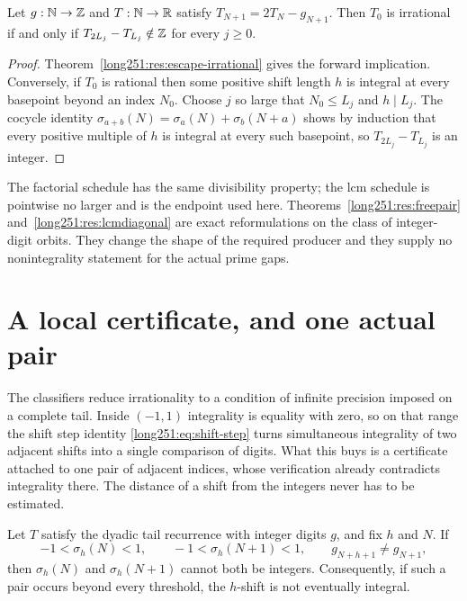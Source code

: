 \documentclass[11pt]{article}
\begin{document}
\begin{theorem}\label{long251:res:lcmdiagonal}
Let $g:\mathbb{N}\to\mathbb{Z}$ and $T:\mathbb{N}\to\mathbb{R}$ satisfy $T_{N+1}=2T_N-g_{N+1}$.  Then
$T_0$ is irrational if and only if
$T_{2L_j}-T_{L_j}\notin\mathbb{Z}$ for every $j\ge0$.
\end{theorem}

\begin{proof}
Theorem~\ref{long251:res:escape-irrational} gives the forward implication.  Conversely,
if $T_0$ is rational then some positive shift length $h$ is integral at every
basepoint beyond an index $N_0$.  Choose $j$ so large that $N_0\le L_j$ and
$h\mid L_j$.  The cocycle identity
$\sigma_{a+b}(N)=\sigma_a(N)+\sigma_b(N+a)$ shows by induction that every
positive multiple of $h$ is integral at every such basepoint, so
$T_{2L_j}-T_{L_j}$ is an integer.
\end{proof}

The factorial schedule has the same divisibility property; the lcm schedule is
pointwise no larger and is the endpoint used here.  Theorems~\ref{long251:res:freepair}
and~\ref{long251:res:lcmdiagonal} are exact reformulations on the class of
integer-digit orbits.  They change the shape of the required producer and they
supply no nonintegrality statement for the actual prime gaps.

\section{A local certificate, and one actual pair}\label{long251:sec:local-certificate}

The classifiers reduce irrationality to a condition of infinite precision
imposed on a complete tail.  Inside $(-1,1)$ integrality is equality with zero,
so on that range the shift step identity \eqref{long251:eq:shift-step} turns
simultaneous integrality of two adjacent shifts into a single comparison of
digits.  What this buys is a certificate attached to one pair of adjacent
indices, whose verification already contradicts integrality there.  The
distance of a shift from the integers never has to be estimated.

\begin{theorem}\label{long251:res:smallpair}
Let $T$ satisfy the dyadic tail recurrence with integer digits $g$, and fix
$h$ and $N$.  If
\[
 -1<\sigma_h(N)<1,\qquad -1<\sigma_h(N+1)<1,
 \qquad g_{N+h+1}\ne g_{N+1},
\]
then $\sigma_h(N)$ and $\sigma_h(N+1)$ cannot both be integers.  Consequently,
if such a pair occurs beyond every threshold, the $h$-shift is not eventually
integral.
\end{theorem}
\end{document}
